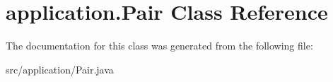 \hypertarget{classapplication_1_1_pair}{\section{application.\+Pair Class Reference}
\label{classapplication_1_1_pair}
}


The documentation for this class was generated from the following file\+:\begin{DoxyCompactItemize}
\item 
src/application/Pair.\+java\end{DoxyCompactItemize}
